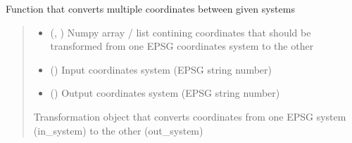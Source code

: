 \documentclass[letterpaper,10pt,english]{sphinxmanual}
\begin{document}
\begin{fulllineitems}
\label{\detokenize{geo_utilities:geo_utilities.convert_coords}}
\pysigstartsignatures
{}
\pysigstopsignatures
\sphinxAtStartPar
Function that converts multiple coordinates between given systems
\begin{quote}\begin{description}
\begin{itemize}
\item {} 
\sphinxAtStartPar
{} (\sphinxcode{\sphinxupquote{Union}}{[}, \sphinxcode{\sphinxupquote{List}}{[}\sphinxcode{\sphinxupquote{List}}{[}\sphinxcode{\sphinxupquote{float}}{]}{]}{]}) \textendash{} Numpy array / list contining coordinates that should be transformed from one EPSG coordinates
system to the other

\item {} 
\sphinxAtStartPar
{} () \textendash{} Input coordinates system (EPSG string number)

\item {} 
\sphinxAtStartPar
{} () \textendash{} Output coordinates system (EPSG string number)

\end{itemize}

\sphinxAtStartPar
{}

\sphinxAtStartPar
Transformation object that converts coordinates from one EPSG system (in\_system) to the other (out\_system)

\end{description}\end{quote}

\end{fulllineitems}

\end{document}
